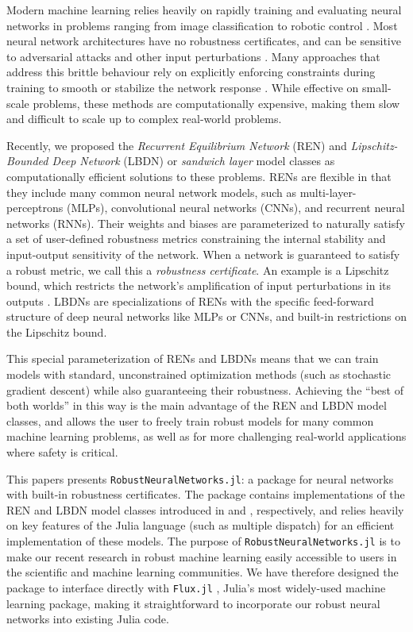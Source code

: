 Modern machine learning relies heavily on rapidly training and evaluating neural networks in problems ranging from image classification \cite{He++2016} to robotic control \cite{Siekmann++2021a}. Most neural network architectures have no robustness certificates, and can be sensitive to adversarial attacks and other input perturbations \cite{Huang++2017}. Many approaches that address this brittle behaviour rely on explicitly enforcing constraints during training to smooth or stabilize the network response \cite{Pauli++2022,Junnarkar++2023}. While effective on small-scale problems, these methods are computationally expensive, making them slow and difficult to scale up to complex real-world problems.

Recently, we proposed the \textit{Recurrent Equilibrium Network} (REN) \cite{Revay++2023} and \textit{Lipschitz-Bounded Deep Network} (LBDN) or \textit{sandwich layer} \cite{Wang+Manchester2023} model classes as computationally efficient solutions to these problems. RENs are flexible in that they include many common neural network models, such as multi-layer-perceptrons (MLPs), convolutional neural networks (CNNs), and recurrent neural networks (RNNs). Their weights and biases are parameterized to naturally satisfy a set of user-defined robustness metrics constraining the internal stability and input-output sensitivity of the network. When a network is guaranteed to satisfy a robust metric, we call this a \textit{robustness certificate}. An example is a Lipschitz bound, which restricts the network's amplification of input perturbations in its outputs \cite{Pauli++2022}. LBDNs are specializations of RENs with the specific feed-forward structure of deep neural networks like MLPs or CNNs, and built-in restrictions on the Lipschitz bound.

This special parameterization of RENs and LBDNs means that we can train models with standard, unconstrained optimization methods (such as stochastic gradient descent) while also guaranteeing their robustness. Achieving the “best of both worlds” in this way is the main advantage of the REN and LBDN model classes, and allows the user to freely train robust models for many common machine learning problems, as well as for more challenging real-world applications where safety is critical.

This papers presents \verb|RobustNeuralNetworks.jl|: a package for neural networks with built-in robustness certificates. The package contains implementations of the REN and LBDN model classes introduced in \cite{Revay++2023} and \cite{Wang+Manchester2023}, respectively, and relies heavily on key features of the Julia language \cite{Bezanson++2017} (such as multiple dispatch) for an efficient implementation of these models. The purpose of \verb|RobustNeuralNetworks.jl| is to make our recent research in robust machine learning easily accessible to users in the scientific and machine learning communities. We have therefore designed the package to interface directly with \verb|Flux.jl| \cite{Innes2018}, Julia's most widely-used machine learning package, making it straightforward to incorporate our robust neural networks into existing Julia code.

